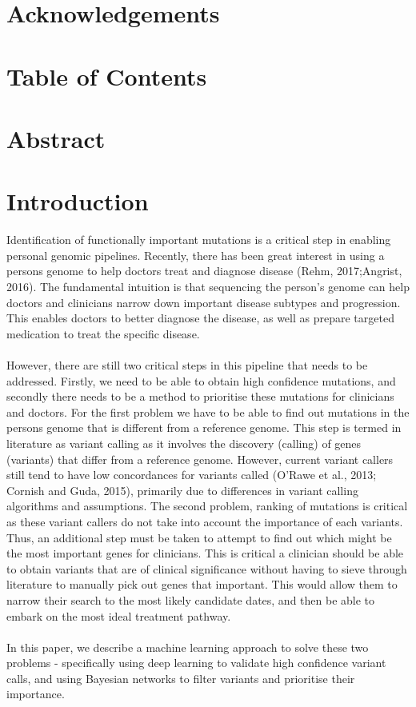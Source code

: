 \documentclass{article}
\begin{document}
\section*{Acknowledgements}
\newpage
\section*{Table of Contents}
\tableofcontents
\newpage
\section*{Abstract}
\doublespace
\normalsize
{} 
\section{Introduction}

Identification of functionally important mutations is a critical step in enabling personal genomic pipelines. Recently, there has been great interest in using a persons genome to help doctors treat and diagnose disease (Rehm, 2017;Angrist, 2016). The fundamental intuition is that sequencing the person's genome can help doctors and clinicians narrow down important disease subtypes and progression. This enables doctors to better diagnose the disease, as well as prepare targeted medication to treat the specific disease. \\\\However, there are still two critical steps in this pipeline that needs to be addressed. Firstly, we need to be able to obtain high confidence mutations, and secondly there needs to be a method to prioritise these mutations for clinicians and doctors. For the first problem we have to be able to find out mutations in the persons genome that is different from a reference genome. This step is termed in literature as variant calling as it involves the discovery (calling) of genes (variants) that differ from a reference genome. However, current variant callers still tend to have low concordances for variants called (O'Rawe et al., 2013; Cornish and Guda, 2015), primarily due to differences in variant calling algorithms and assumptions. The second problem, ranking of mutations is critical as these variant callers do not take into account the importance of each variants. Thus, an additional step must be taken to attempt to find out which might be the most important genes for clinicians. This is critical a clinician should be able to obtain variants that are of clinical significance without having to sieve through literature to manually pick out genes that important. This would allow them to narrow their search to the most likely candidate dates, and then be able to embark on the most ideal treatment pathway. \\\\In this paper, we describe a machine learning approach to solve these two problems - specifically using deep learning to validate high confidence variant calls, and using Bayesian networks to filter variants and prioritise their importance. \\
\end{document}
